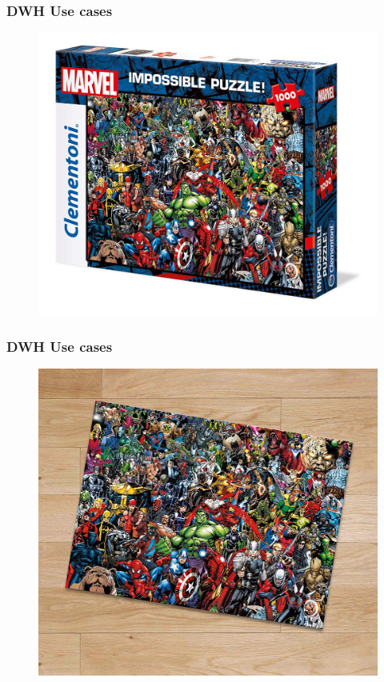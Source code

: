 \begin{frame}
\frametitle{DWH Use cases}
\begin{figure}[ht]
	
	\centering
	\includegraphics[width=\linewidth,height=.8\textheight]{./Figures/chapter-01/Marvel-03.jpg}
\end{figure}
\end{frame}

\begin{frame}
\frametitle{DWH Use cases}
\begin{figure}[ht]
	
	\centering
	\includegraphics[width=\linewidth,height=.8\textheight]{./Figures/chapter-01/Marvel-02.jpg}
\end{figure}
\end{frame}

